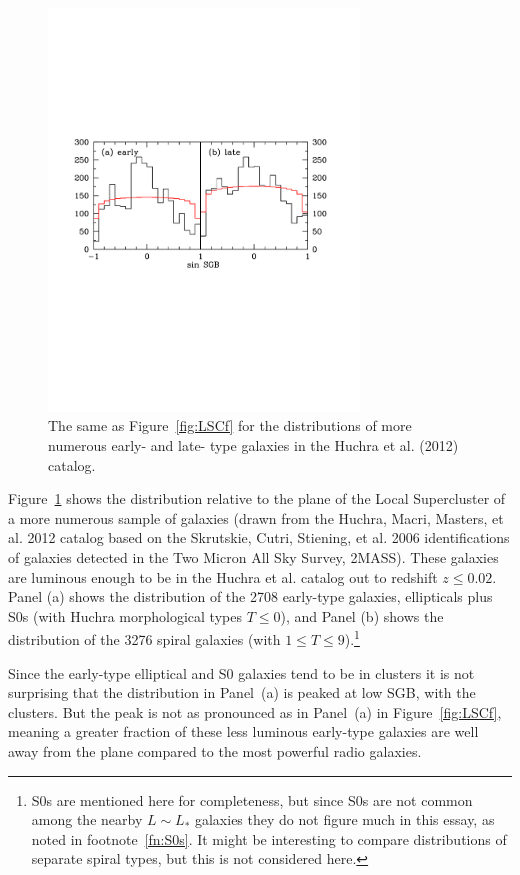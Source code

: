 \documentclass[fleqn,12pt]{article}
\begin{document}
\begin{figure}
\begin{center}
\includegraphics[angle=0,width=3.25in]{allearlylate.pdf} 
\caption{The same as Figure~\ref{fig:LSCf} for the distributions of more numerous  early- and late- type galaxies in the Huchra et al. (2012) catalog.}\label{fig:commongalaxies}
\end{center}
\end{figure}

Figure~\ref{fig:commongalaxies} shows the distribution relative to the plane of the Local Supercluster of a more numerous sample of galaxies (drawn from the Huchra, Macri, Masters, et al. 2012 catalog based on the Skrutskie, Cutri, Stiening, et al. 2006 identifications  of galaxies detected in the Two Micron All Sky Survey, 2MASS). These galaxies are luminous enough to be in the Huchra et al. catalog out to redshift $z\leq 0.02$. Panel (a) shows the distribution of the 2708 early-type galaxies, ellipticals plus S0s (with Huchra morphological types $T\leq 0$), and Panel (b) shows the distribution of the 3276 spiral galaxies (with $1\leq T\leq 9$).\footnote{S0s are mentioned here for completeness, but since S0s are not common among the nearby $L\sim L_\ast$ galaxies they do not figure much in this essay, as noted in footnote~\ref{fn:S0s}. It might be interesting to compare distributions of separate spiral types, but this is not considered here.} 

Since the early-type elliptical and S0 galaxies tend to be in clusters it is not surprising that the distribution in Panel~(a) is peaked at low SGB, with the clusters. But the peak is not as pronounced as in Panel~(a) in Figure~\ref{fig:LSCf}, meaning a greater fraction of these less luminous early-type galaxies are well away from the plane compared to the most powerful radio galaxies.
\end{document}
